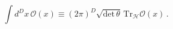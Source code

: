 \begin{equation}
   \int d^Dx \,\mathcal{O}(x)\equiv (2\pi)^D \sqrt{\mathrm{det}\,\theta}\,
 \mathrm{Tr}_{\mathcal{H}}\mathcal{O}(x)\,.\label{eq:3.6}
\end{equation}

